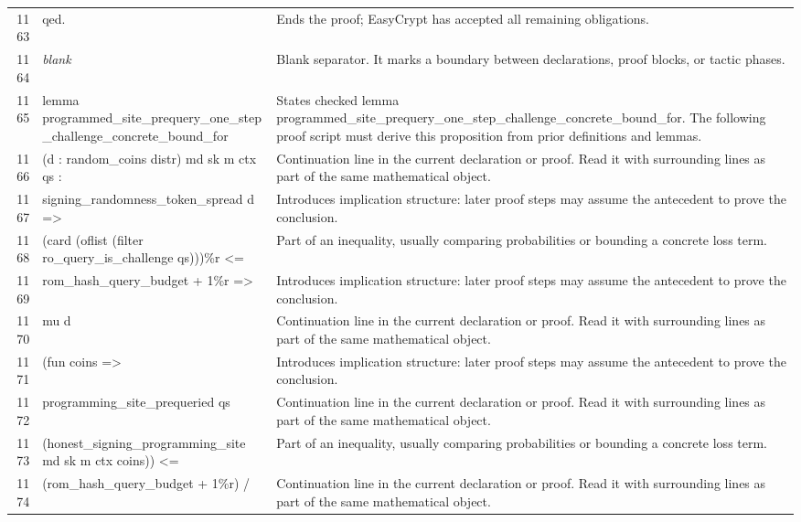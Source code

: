 \documentclass[10pt]{article}
\begin{document}
\begin{longtable}{r L{0.53\textwidth} L{0.37\textwidth}}
1163 & {\ttfamily\scriptsize qed.} & Ends the proof; EasyCrypt has accepted all remaining obligations. \\
1164 & {\ttfamily\scriptsize \emph{blank}} & Blank separator.  It marks a boundary between declarations, proof blocks, or tactic phases. \\
1165 & {\ttfamily\scriptsize lemma programmed\_site\_prequery\_one\_step\_challenge\_concrete\_bound\_for} & States checked lemma programmed\_site\_prequery\_one\_step\_challenge\_concrete\_bound\_for.  The following proof script must derive this proposition from prior definitions and lemmas. \\
1166 & {\ttfamily\scriptsize   (d : random\_coins distr) md sk m ctx qs :} & Continuation line in the current declaration or proof.  Read it with surrounding lines as part of the same mathematical object. \\
1167 & {\ttfamily\scriptsize   signing\_randomness\_token\_spread d =>} & Introduces implication structure: later proof steps may assume the antecedent to prove the conclusion. \\
1168 & {\ttfamily\scriptsize   (card (oflist (filter ro\_query\_is\_challenge qs)))\%r <=} & Part of an inequality, usually comparing probabilities or bounding a concrete loss term. \\
1169 & {\ttfamily\scriptsize     rom\_hash\_query\_budget + 1\%r =>} & Introduces implication structure: later proof steps may assume the antecedent to prove the conclusion. \\
1170 & {\ttfamily\scriptsize   mu d} & Continuation line in the current declaration or proof.  Read it with surrounding lines as part of the same mathematical object. \\
1171 & {\ttfamily\scriptsize     (fun coins =>} & Introduces implication structure: later proof steps may assume the antecedent to prove the conclusion. \\
1172 & {\ttfamily\scriptsize       programming\_site\_prequeried qs} & Continuation line in the current declaration or proof.  Read it with surrounding lines as part of the same mathematical object. \\
1173 & {\ttfamily\scriptsize         (honest\_signing\_programming\_site md sk m ctx coins)) <=} & Part of an inequality, usually comparing probabilities or bounding a concrete loss term. \\
1174 & {\ttfamily\scriptsize   (rom\_hash\_query\_budget + 1\%r) /} & Continuation line in the current declaration or proof.  Read it with surrounding lines as part of the same mathematical object. \\

\end{longtable}
\end{document}
